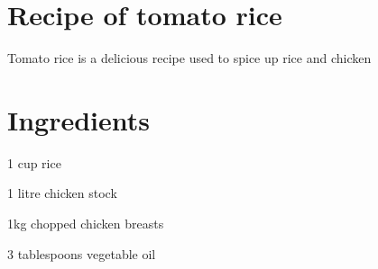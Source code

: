 \section { Recipe of tomato rice}
Tomato rice is a delicious recipe used to spice up rice and chicken
\section {Ingredients}
\begin {items}
\item 1 cup rice
\item 1 litre chicken stock
\item 1kg chopped chicken breasts
\item 3 tablespoons vegetable oil

\end {items}

